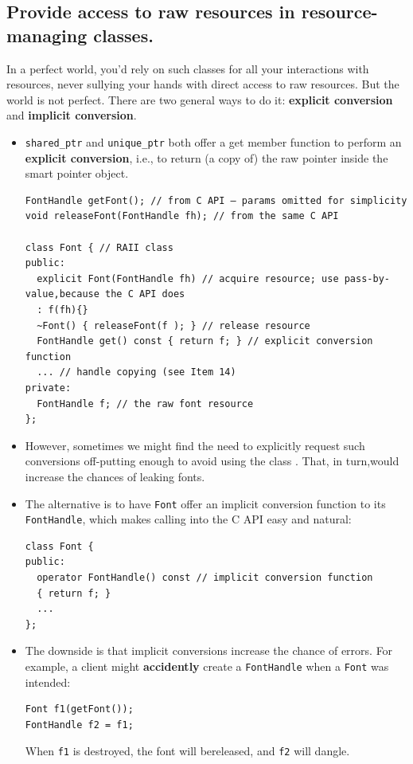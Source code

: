 \documentclass[a4paper,twoside]{article}
\theoremstyle{definition}
\theoremstyle{remark}
\numberwithin{equation}{section}
\let\OldTexttt\texttt
\renewcommand{\texttt}[1]{{\color{blue} \OldTexttt{#1}}}
\begin{document}
\subsection{Provide access to raw resources in resource-managing classes. }
\label{sec:Item-15}

In a perfect world, you'd rely on such classes for all your
interactions with resources, never sullying your hands with direct
access to raw resources. But the world is not perfect. There are two
general ways to do it: \textbf{explicit conversion } and
\textbf{implicit conversion}.

\begin{itemize}
\item \texttt{shared\_ptr} and \texttt{unique\_ptr} both offer a get
  member function to perform an \textbf{explicit conversion}, i.e., to return
  (a copy of) the raw pointer inside the smart pointer object.
\begin{verbatim}
FontHandle getFont(); // from C API — params omitted for simplicity
void releaseFont(FontHandle fh); // from the same C API

class Font { // RAII class
public:
  explicit Font(FontHandle fh) // acquire resource; use pass-by-value,because the C API does
  : f(fh){}
  ~Font() { releaseFont(f ); } // release resource
  FontHandle get() const { return f; } // explicit conversion function
  ... // handle copying (see Item 14)
private:
  FontHandle f; // the raw font resource
};
\end{verbatim}
\item However, sometimes we might find the need to explicitly request
  such conversions off-putting enough to avoid using the class . That,
  in turn,would increase the chances of leaking fonts.
\item The alternative is to have \texttt{Font} offer an implicit conversion
  function to its \texttt{FontHandle}, which  makes calling into the C
  API easy and natural:
\begin{verbatim}
class Font {
public:
  operator FontHandle() const // implicit conversion function
  { return f; }
  ...
};
\end{verbatim}
\item The downside is that implicit conversions increase the chance of
errors. For example, a client might \textbf{accidently} create a
\texttt{FontHandle} when a \texttt{Font} was intended:
\begin{verbatim}
Font f1(getFont());
FontHandle f2 = f1;
\end{verbatim}
When \texttt{f1} is destroyed, the font will bereleased, and
\texttt{f2} will dangle.
\end{itemize}
\end{document}
